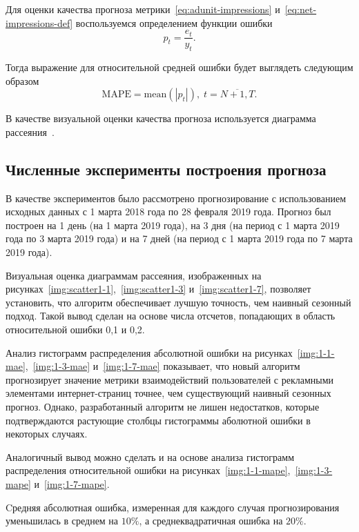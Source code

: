 Для оценки качества прогноза метрики~\eqref{eq:adunit-impressions} и~\eqref{eq:net-impressions-def} воспользуемся определением функции
ошибки
\begin{equation}
    p_t = \dfrac{e_t}{y_t}.
\end{equation}

Тогда выражение для относительной средней ошибки будет выглядеть следующим образом
\begin{equation}
    \text{MAPE} = \text{mean}\left( \left| p_t \right| \right),\; t = \overline{N+1, T}.
\end{equation}

В качестве визуальной оценки качества прогноза используется диаграмма рассеяния~\autocite{eval:scatter}.

\subsection{Численные эксперименты построения прогноза}

В качестве экспериментов было рассмотрено прогнозирование с использованием исходных 
данных с 1 марта 2018 года по 28 февраля 2019 года. Прогноз был построен на 1 день (на 1 марта 2019 года),
на 3 дня (на период с 1 марта 2019 года по 3 марта 2019 года) и на 7 дней (на период с 1 марта 2019 года
по 7 марта 2019 года).

Визуальная оценка диаграммам рассеяния, изображенных на рисунках~\ref{img:scatter1-1},~\ref{img:scatter1-3}
и~\ref{img:scatter1-7}, позволяет установить, что алгоритм обеспечивает лучшую точность,
чем наивный сезонный подход. Такой вывод сделан на основе числа отсчетов, попадающих в область 
относительной ошибки 0,1 и 0,2.

Анализ гистограмм распределения абсолютной ошибки на рисунках~\ref{img:1-1-mae},~\ref{img:1-3-mae} и~\ref{img:1-7-mae}
показывает, что новый алгоритм прогнозирует значение метрики взаимодействий пользователей с
рекламными элементами интернет-страниц точнее, чем существующий наивный сезонных прогноз. Однако,
разработанный алгоритм не лишен недостатков, которые подтверждаются растующие столбцы гистограммы
аболютной ошибки в некоторых случаях.

Аналогичный вывод можно сделать и на основе анализа гистограмм распределения относительной ошибки
на рисунках~\ref{img:1-1-mape},~\ref{img:1-3-mape} и~\ref{img:1-7-mape}.

Cредняя абсолютная ошибка, измеренная для каждого случая прогнозирования уменьшилась в среднем на $10\%$, а среднеквадратичная ошибка на $20\%$.
\medskip










